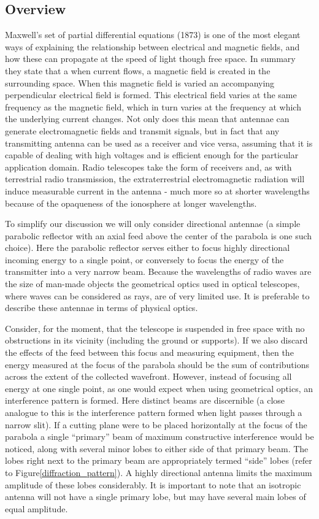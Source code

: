 \subsection{Overview}
Maxwell's set of partial differential equations (1873) is one of the most elegant ways of explaining the relationship between electrical and magnetic fields, and how these can propagate at the speed of light 
though free space. In summary they state that a when current flows, a magnetic field is created in the surrounding space. When this magnetic field is varied an accompanying perpendicular electrical field is formed. This electrical field 
varies at the same frequency as the magnetic field, which in turn varies at the frequency at which the underlying current changes. Not only does this mean that antennae can generate electromagnetic fields and transmit signals, 
but in fact that any transmitting antenna can be used as a receiver and vice versa, assuming that it is capable of dealing with high voltages and is efficient enough for the particular application domain. Radio telescopes 
take the form of receivers and, as with terrestrial radio transmission, the extraterrestrial electromagnetic radiation will induce measurable current in the antenna - much more so at shorter wavelengths 
because of the opaqueness of the ionosphere at longer wavelengths.

To simplify our discussion we will only consider directional antennae (a simple parabolic reflector with an axial feed above the center of the parabola is 
one such choice). Here the parabolic reflector serves either to focus highly directional incoming energy to a single point, or conversely to 
focus the energy of the transmitter into a very narrow beam. Because the wavelengths of radio waves are the size of man-made objects the geometrical optics 
used in optical telescopes, where waves can be considered as rays, are of very limited use. It is preferable to describe these antennae in terms of 
physical optics.

Consider, for the moment, that the telescope is suspended in free space with no obstructions in its vicinity (including the ground or supports). If
we also discard the effects of the feed between this focus and measuring equipment, then the energy measured at the focus 
of the parabola should be the sum of contributions across the extent of the collected wavefront. However, instead of focusing all 
energy at one single point, as one would expect when using geometrical optics, an interference pattern is formed. Here
distinct beams are discernible (a close analogue to this is the interference pattern formed when light passes through a narrow slit).
If a cutting plane were to be placed horizontally at the focus of the parabola a single ``primary'' beam of maximum 
constructive interference would be noticed, along with several minor lobes to either side of that primary beam. The lobes right 
next to the primary beam are appropriately termed ``side'' lobes (refer to Figure\ref{diffraction_pattern}). A highly directional antenna 
limits the maximum amplitude of these lobes considerably. It is important to note that an isotropic antenna will not have a single primary 
lobe, but may have several main lobes of equal amplitude. 

